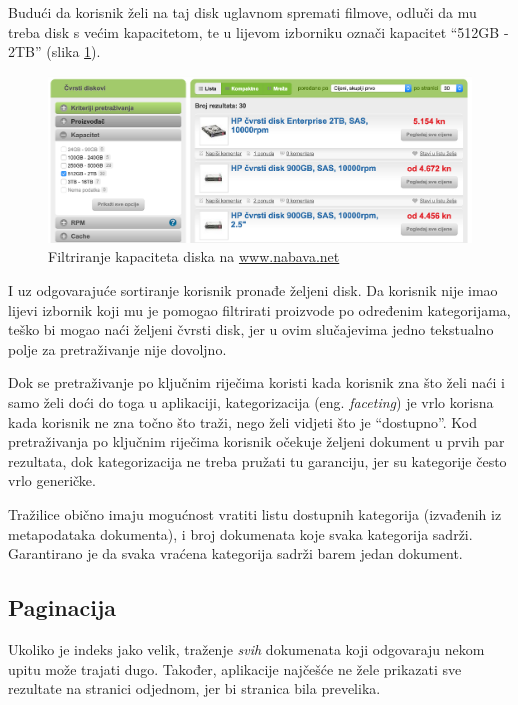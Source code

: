 \documentclass[a4paper,twoside,12pt]{scrreprt}
\begin{document}
Budući da korisnik želi na taj disk uglavnom spremati filmove, odluči da mu treba disk s većim kapacitetom, te u lijevom izborniku označi kapacitet ``512GB - 2TB'' (slika \ref{nabava3}).

\begin{figure}[H]
  \centering
  \includegraphics[width=\textwidth]{nabava3}
  \caption{Filtriranje kapaciteta diska na \url{www.nabava.net}}
  \label{nabava3}
\end{figure}

I uz odgovarajuće sortiranje korisnik pronađe željeni disk. Da korisnik nije imao lijevi izbornik koji mu je pomogao filtrirati proizvode po određenim kategorijama, teško bi mogao naći željeni čvrsti disk, jer u ovim slučajevima jedno tekstualno polje za pretraživanje nije dovoljno.

Dok se pretraživanje po ključnim riječima koristi kada korisnik zna što želi naći i samo želi doći do toga u aplikaciji, kategorizacija (eng. \textit{faceting}) je vrlo korisna kada korisnik ne zna točno što traži, nego želi vidjeti što je ``dostupno''. Kod pretraživanja po ključnim riječima korisnik očekuje željeni dokument u prvih par rezultata, dok kategorizacija ne treba pružati tu garanciju, jer su kategorije često vrlo generičke.

Tražilice obično imaju mogućnost vratiti listu dostupnih kategorija (izvađenih iz metapodataka dokumenta), i broj dokumenata koje svaka kategorija sadrži. Garantirano je da svaka vraćena kategorija sadrži barem jedan dokument.

\subsection{Paginacija}

Ukoliko je indeks jako velik, traženje \textit{svih} dokumenata koji odgovaraju nekom upitu može trajati dugo. Također, aplikacije najčešće ne žele prikazati sve rezultate na stranici odjednom, jer bi stranica bila prevelika.
\end{document}
